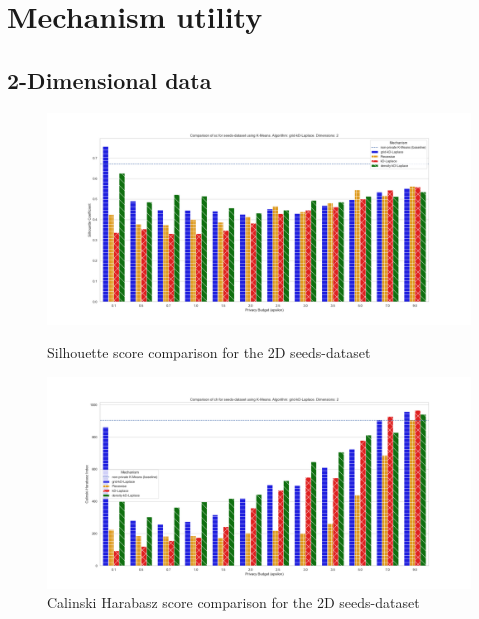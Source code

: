 \section{Mechanism utility} \label{appendix:results-mechanism-utility}
\subsection{2-Dimensional data}
\begin{figure}[H]
    \centering
    \begin{minipage}[c]{0.8\textwidth}
        \includegraphics[width=1\textwidth]{Results/RQ1/seeds-dataset/sc_seeds-dataset_comparison.png}
        \caption{Silhouette score comparison for the 2D seeds-dataset}
        \label{fig:appendix-sc_seeds-dataset_comparison_2d}
    \end{minipage}
    \begin{minipage}[c]{0.8\textwidth}
        \includegraphics[width=1\textwidth]{Results/RQ1/seeds-dataset/ch_seeds-dataset_comparison.png}
        \caption{Calinski Harabasz score comparison for the 2D seeds-dataset}
        \label{fig:appendix-ch_seeds-dataset_comparison_2d}
    \end{minipage}

\end{figure}
